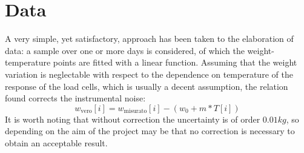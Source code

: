 \section{Data}
A very simple, yet satisfactory, approach has been taken to the elaboration of data: a sample over one or more days is considered, of which the weight-temperature points are fitted with a linear function. Assuming that the weight variation is neglectable with respect to the dependence on temperature of the response of the load cells, which is usually a decent assumption, the relation found corrects the instrumental noise:
\[ w_{\mathrm{vero}}[i] = w_{\mathrm{misurato}}[i] - (w_0 + m*T[i]) \]
It is worth noting that without correction the uncertainty is of order $0.01 kg$, so depending on the aim of the project may be that no correction is necessary to obtain an acceptable result.

